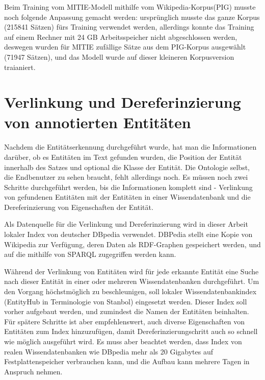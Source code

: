 Beim Training vom MITIE-Modell mithilfe vom Wikipedia-Korpus(PIG) musste noch folgende Anpassung gemacht werden: ursprünglich musste das ganze Korpus (215841 Sätzen) fürs Training verwendet werden, allerdings konnte das Training auf einem Rechner mit 24 GB Arbeitsspeicher nicht abgeschlossen werden, deswegen wurden für MITIE zufällige Sätze aus dem PIG-Korpus ausgewählt (71947 Sätzen), und das Modell wurde auf dieser kleineren Korpusversion traianiert.

\section{Verlinkung und Dereferinzierung von annotierten Entitäten} \label{sec:VERLINKUNGSEC}
\paragraph{}
Nachdem die Entitätserkennung durchgeführt wurde, hat man die Informationen darüber, ob es Entitäten im Text gefunden wurden, die Position der Entität innerhalb des Satzes und optional die Klasse der Entität. Die Ontologie selbst, die Endbenutzer zu sehen braucht, fehlt allerdings noch. Es müssen noch zwei Schritte durchgeführt werden, bis die Informationen komplett sind - Verlinkung von gefundenen Entitäten mit der Entitäten in einer Wissendatenbank und die Dereferinzierung von Eigenschaften der Entität.

Als Datenquelle für die Verlinkung und Dereferinzierung wird in dieser Arbeit lokaler Index von deutscher DBpedia\cite{auer2007dbpedia} verwendet. DBPedia stellt eine Kopie von Wikipedia zur Verfügung, deren Daten als RDF-Graphen gespeichert werden, und auf die mithilfe von SPARQL zugegriffen werden kann.

Während der Verlinkung von Entitäten wird für jede erkannte Entität eine Suche nach dieser Entität in einer oder mehreren Wissendatenbanken durchgeführt. Um den Vorgang höchstmöglich zu beschleunigen, soll lokaler Wissendatenbankindex (EntityHub in Terminologie von Stanbol) eingesetzt werden. Dieser Index soll vorher aufgebaut werden, und zumindest die Namen der Entitäten beinhalten. Für spätere Schritte ist aber empfehlenswert, auch diverse Eigenschaften von Entitäten zum Index hinzuzufügen, damit Dereferinzierungschritt auch so schnell wie möglich ausgeführt wird. Es muss aber beachtet werden, dass Index von realen Wissendatenbanken wie DBpedia mehr als 20 Gigabytes auf Festplattenspeicher verbrauchen kann, und die Aufbau kann mehrere Tagen in Anspruch nehmen.

